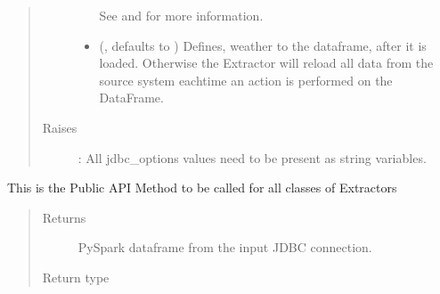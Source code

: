 \documentclass[a4paper,10pt, twoside,english]{sphinxmanual}
\begin{document}
\begin{fulllineitems}
\begin{quote}
\begin{description}
\begin{itemize}
\begin{description}
\begin{itemize}
\end{itemize}

\end{description}

See  and
 for more information.


\item {} 
 (, defaults to ) \textendash{} Defines, weather to  the dataframe, after it is loaded.
Otherwise the Extractor will reload all data from the source system eachtime an action is
performed on the DataFrame.

\end{itemize}

\item[{Raises}] \leavevmode
{}: \textendash{} All jdbc\_options values need to be present as string variables.

\end{description}\end{quote}

\begin{fulllineitems}
\label{\detokenize{extractor/jdbc:spooq2.extractor.jdbc.JDBCExtractorFullLoad.extract}}
This is the Public API Method to be called for all classes of Extractors
\begin{quote}\begin{description}
\item[{Returns}] \leavevmode
PySpark dataframe from the input JDBC connection.

\item[{Return type}] \leavevmode
{}

\end{description}\end{quote}

\end{fulllineitems}


\end{fulllineitems}
\end{document}
